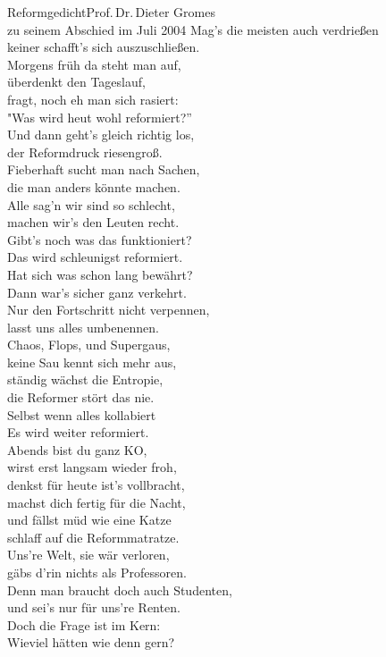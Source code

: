 \begin{lied*}{Reformgedicht}{Prof.\,Dr.\,Dieter Gromes\\zu seinem Abschied im Juli 2004}
Mag's die meisten auch verdrießen\\
keiner schafft's sich auszuschließen.\\
Morgens früh da steht man auf,\\
überdenkt den Tageslauf,\\
fragt, noch eh man sich rasiert:\\
"Was wird heut wohl reformiert?''\\

Und dann geht's gleich richtig los,\\
der Reformdruck riesengroß.\\
Fieberhaft sucht man nach Sachen,\\
die man anders könnte machen.\\
Alle sag'n wir sind so schlecht,\\
machen wir's den Leuten recht.\\
Gibt's noch was das funktioniert?\\
Das wird schleunigst reformiert.\\
Hat sich was schon lang bewährt?\\
Dann war's sicher ganz verkehrt.\\

Nur den Fortschritt nicht verpennen,\\
lasst uns alles umbenennen.\\
Chaos, Flops, und Supergaus,\\
keine Sau kennt sich mehr aus,\\
ständig wächst die Entropie,\\
die Reformer stört das nie.\\
Selbst wenn alles kollabiert\\
Es wird weiter reformiert.\\

Abends bist du ganz KO,\\
wirst erst langsam wieder froh,\\
denkst \glqq für heute ist's vollbracht\grqq ,\\
machst dich fertig für die Nacht,\\
und fällst müd wie eine Katze\\
schlaff auf die Reformmatratze.\\

Uns're Welt, sie wär verloren,\\
gäbs d'rin nichts als Professoren.\\
Denn man braucht doch auch Studenten,\\
und sei's nur für uns're Renten.\\
Doch die Frage ist im Kern:\\
\glqq Wieviel hätten wie denn gern?\grqq\\


\end{lied*}
